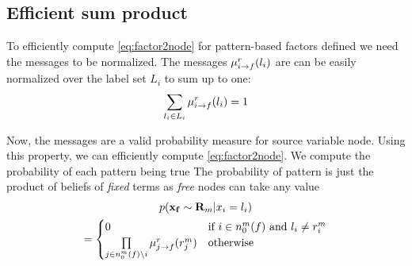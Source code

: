 \documentclass[letterpaper, 10 pt, conference]{ieeeconf} %
\newcommand{\vect}[1]{\mathbf{#1}}
\begin{document}

\subsection{Efficient sum product}

To efficiently compute \eqref{eq:factor2node} for pattern-based factors
defined %
we need the messages to be
normalized. The messages $\bpmsg{i}{f}{l_i}{r}$ are can be easily normalized
over the label set $L_i$ to sum up to one:
\begin{align}
  \sum_{l_i \in L_i} \bpmsg{i}{f}{l_i}{r} = 1
\end{align}

Now, the messages are a valid probability measure for source variable node.
Using this property, we can efficiently compute \eqref{eq:factor2node}. We
compute the probability of each pattern being true
The probability of pattern is just the product of beliefs of \emph{fixed}
terms as \emph{free} nodes can take any value
\begin{multline}
  p(\vect{x_f} \sim \vect{R}_m|x_i = l_i) \\
  = \begin{cases}
0 & \text{if $i \in n^m_0(f)$ and $l_i \ne r^m_i$}\\
  \prod\limits_{j \in n^m_0(f) \setminus i}\bpmsg{j}{f}{r^m_j}{r} & \text{otherwise}
  \end{cases}
\end{multline}
\end{document}
